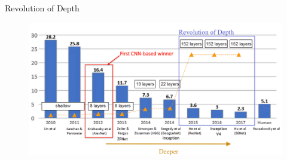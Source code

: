 \documentclass[serif, aspectratio=169]{beamer}
\begin{document}
\begin{frame}{Revolution of Depth}
	\begin{figure}[htpb]
		\begin{center}
			\includegraphics[keepaspectratio, scale=0.25]{pic/resnet-chart}
		\end{center}
	\end{figure}
\end{frame}
\end{document}
